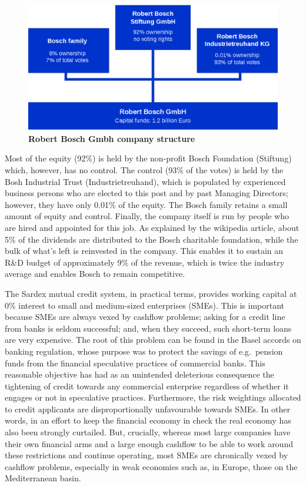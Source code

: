 \begin{figure}[h]
\centering
\includegraphics[width=12 cm]{Figures/Bosch}
\caption{\bf \small Robert Bosch Gmbh company structure}
\label{fig:bosch}
\end{figure}

Most of the equity (92\%) is held by the non-profit Bosch Foundation (Stiftung) which, however, has no control. The control (93\% of the votes) is held by the Bosh Industrial Trust (Industrietreuhand), which is populated by experienced business persons who are elected to this post and by past Managing Directors; however, they have only 0.01\% of the equity. The Bosch family retains a small amount of equity and control. Finally, the company itself is run by people who are hired and appointed for this job. As explained by the wikipedia article, about 5\% of the dividends are distributed to the Bosch charitable foundation, while the bulk of what's left is reinvested in the company. This enables it to sustain an R\&D budget of approximately 9\% of the revenue, which is twice the industry average and enables Bosch to remain competitive.

The Sardex mutual credit system, in practical terms, provides working capital at 0\% interest to small and medium-sized enterprises (SMEs). This is important because SMEs are always vexed by cashflow problems; asking for a credit line from banks is seldom successful; and, when they succeed, such short-term loans are very expensive. The root of this problem can be found in the Basel accords on banking regulation, whose purpose was to protect the savings of e.g.\ pension funds from the financial speculative practices of commercial banks. This reasonable objective has had as an unintended deleterious consequence the tightening of credit towards any commercial enterprise regardless of whether it engages or not in speculative practices. Furthermore, the risk weightings allocated to credit applicants are disproportionally unfavourable towards SMEs. In other words, in an effort to keep the financial economy in check the real economy has also been strongly curtailed. But, crucially, whereas most large companies have their own financial arms and a large enough cashflow to be able to work around these restrictions and continue operating, most SMEs are chronically vexed by cashflow problems, especially in weak economies such as, in Europe, those on the Mediterranean basin.

